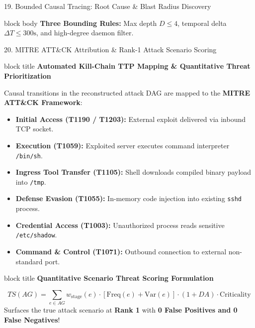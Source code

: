 \documentclass[aspectratio=169,10pt]{beamer}
\begin{document}
\begin{frame}[t]{19. Bounded Causal Tracing: Root Cause \& Blast Radius Discovery}
\vspace{0.25em}

\begin{beamercolorbox}[rounded=true,shadow=false,sep=0.25em,wd=\textwidth]{block body}
\fontsize{7.0pt}{9.5pt}\selectfont
\textbf{Three Bounding Rules:} Max depth $D \le 4$, temporal delta $\Delta T \le 300\text{s}$, and high-degree daemon filter.
\end{beamercolorbox}
\end{frame}

\begin{frame}[t]{20. MITRE ATT\&CK Attribution \& Rank-1 Attack Scenario Scoring}
\vspace{-0.2em}
\begin{beamercolorbox}[rounded=true,shadow=false,sep=0.30em,wd=\textwidth]{block title}
\textbf{\scriptsize Automated Kill-Chain TTP Mapping \& Quantitative Threat Prioritization}
\end{beamercolorbox}
\vspace{0.10em}
{\fontsize{7.0pt}{9.8pt}\selectfont
Causal transitions in the reconstructed attack DAG are mapped to the \textbf{MITRE ATT\&CK Framework}:
\begin{itemize}\itemsep0.15em
  \item \textbf{Initial Access (T1190 / T1203):} External exploit delivered via inbound TCP socket.
  \item \textbf{Execution (T1059):} Exploited server executes command interpreter \texttt{/bin/sh}.
  \item \textbf{Ingress Tool Transfer (T1105):} Shell downloads compiled binary payload into \texttt{/tmp}.
  \item \textbf{Defense Evasion (T1055):} In-memory code injection into existing \texttt{sshd} process.
  \item \textbf{Credential Access (T1003):} Unauthorized process reads sensitive \texttt{/etc/shadow}.
  \item \textbf{Command \& Control (T1071):} Outbound connection to external non-standard port.
\end{itemize}
}

\vspace{0.20em}

\begin{beamercolorbox}[rounded=true,shadow=false,sep=0.30em,wd=\textwidth]{block title}
\textbf{\scriptsize Quantitative Scenario Threat Scoring Formulation}
\end{beamercolorbox}
\vspace{0.08em}
{\fontsize{7.0pt}{9.8pt}\selectfont
\[
TS(AG) = \sum_{e \in AG} w_{\text{stage}}(e) \cdot \left[\text{Freq}(e) + \text{Var}(e)\right] \cdot (1 + DA) \cdot \text{Criticality}
\]
Surfaces the true attack scenario at \textbf{Rank 1} with \textbf{0 False Positives and 0 False Negatives}!
}
\end{frame}
\end{document}
